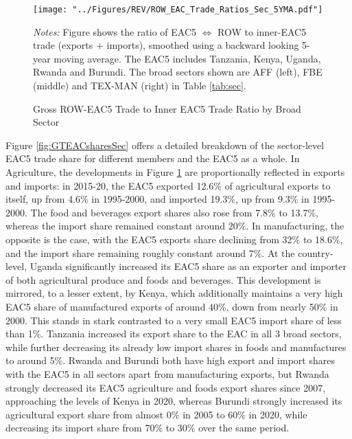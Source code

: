 \documentclass[a4paper]{article}
\begin{document}
\begin{figure}[h!]
\centering
\caption{\label{fig:EAC_ROW_Ratios_Sec} Gross ROW-EAC5 Trade to Inner EAC5 Trade Ratio by Broad Sector}
\texttt{[image: "../Figures/REV/ROW\_EAC\_Trade\_Ratios\_Sec\_5YMA.pdf"]}
\raggedright
\scriptsize 
\emph{Notes:} Figure shows the ratio of EAC5 $\Leftrightarrow$ ROW to inner-EAC5 trade (exports + imports), smoothed using a backward looking 5-year moving average. The EAC5 includes Tanzania, Kenya, Uganda, Rwanda and Burundi. The broad sectors shown are AFF (left), FBE (middle) and TEX-MAN (right) in Table \ref{tab:sec}.
\end{figure}

\newpage

Figure \ref{fig:GTEACsharesSec} offers a detailed breakdown of the sector-level EAC5 trade share for different members and the EAC5 as a whole. In Agriculture, the developments in Figure \ref{fig:EAC_ROW_Ratios_Sec} are proportionally reflected in exports and imports: in 2015-20, the EAC5 exported 12.6\% of agricultural exports to itself, up from 4.6\% in 1995-2000, and imported 19.3\%, up from 9.3\% in 1995-2000. The food and beverages export shares also rose from 7.8\% to 13.7\%, whereas the import share remained constant around 20\%. In manufacturing, the opposite is the case, with the EAC5 exports share declining from 32\% to 18.6\%, and the import share remaining roughly constant around 7\%. At the country-level, Uganda significantly increased its EAC5 share as an exporter and importer of both agricultural produce and foods and beverages. This development is mirrored, to a lesser extent, by Kenya, which additionally maintains a very high EAC5 share of manufactured exports of around 40\%, down from nearly 50\% in 2000. This stands in stark contrasted to a very small EAC5 import share of less than 1\%. Tanzania increased its export share to the EAC in all 3 broad sectors, while further decreasing its already low import shares in foods and manufactures to around 5\%. Rwanda and Burundi both have high export and import shares with the EAC5 in all sectors apart from manufacturing exports, but Rwanda strongly decreased its EAC5 agriculture and foods export shares since 2007, approaching the levels of Kenya in 2020, whereas Burundi strongly increased its agricultural export share from almost 0\% in 2005 to 60\% in 2020, while decreasing its import share from 70\% to 30\% over the same period. \newline 
\end{document}
